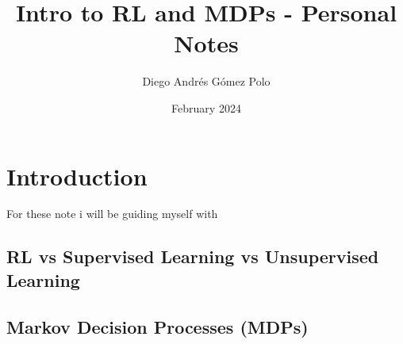 \documentclass{article}
\title{Intro to RL and MDPs - Personal Notes}
\author{Diego Andrés Gómez Polo}
\date{February 2024}
\begin{document}
\maketitle
\tableofcontents
\section{Introduction}

For these note i will be guiding myself with \cite{montague1999reinforcement}

\subsection{RL vs Supervised Learning vs Unsupervised Learning}

\subsection{Markov Decision Processes (MDPs)}


\newpage


\end{document}

